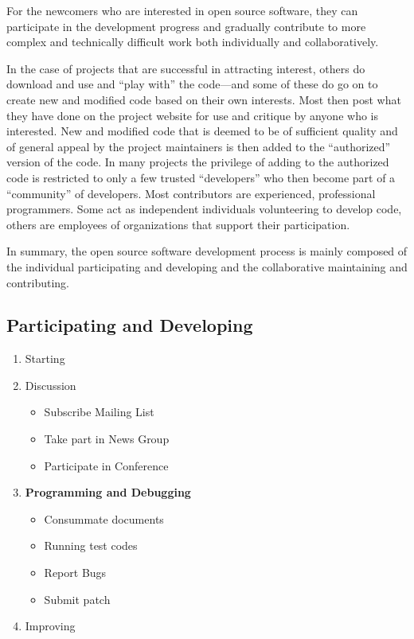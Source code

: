 \documentclass[draftclsnofoot,journal,onecolumn,12pt]{IEEEtran}
\begin{document}
For the newcomers who are interested in open source software, they can participate in the development progress and gradually contribute to more complex and technically difficult work both individually and collaboratively.

In the case of projects that are successful in attracting interest, others do download and use and “play with” the code—and some of these do go on
to create new and modified code based on their own interests. Most then post what they have done on the project website for use and critique by anyone who is interested. New and modified code that is deemed to be of sufficient quality and of general appeal by the project maintainers is then added to the “authorized” version of the code. In many projects the privilege of adding to the authorized code is restricted to only a few trusted “developers” who then become part of a “community” of developers. Most contributors are experienced, professional programmers. Some act as
independent individuals volunteering to develop code, others are employees of organizations that support their participation.

In summary, the open source software development process is mainly composed of the individual participating and developing and the collaborative maintaining and contributing.

\subsection{Participating and Developing}
\begin{enumerate}
  \item Starting
  \item Discussion
  \begin{itemize}
    \item Subscribe Mailing List
    \item Take part in News Group
    \item Participate in Conference
  \end{itemize}
  \item \textbf{Programming and Debugging}
  \begin{itemize}
    \item Consummate documents
    \item Running test codes
    \item Report Bugs
    \item Submit patch
  \end{itemize}
  \item Improving
\end{enumerate}
\end{document}
